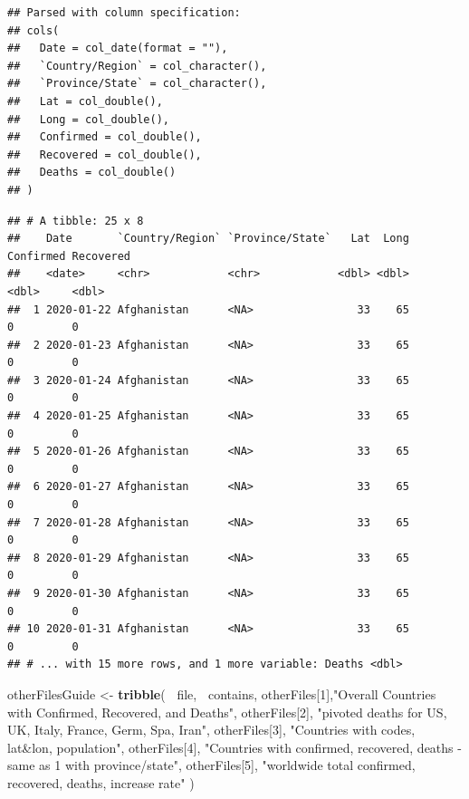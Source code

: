 \documentclass[
]{article}
\newenvironment{Shaded}{\begin{snugshade}}{\end{snugshade}}
\newcommand{\DecValTok}[1]{\textcolor[rgb]{0.00,0.00,0.81}{#1}}
\newcommand{\KeywordTok}[1]{\textcolor[rgb]{0.13,0.29,0.53}{\textbf{#1}}}
\newcommand{\NormalTok}[1]{#1}
\newcommand{\OperatorTok}[1]{\textcolor[rgb]{0.81,0.36,0.00}{\textbf{#1}}}
\newcommand{\StringTok}[1]{\textcolor[rgb]{0.31,0.60,0.02}{#1}}
\begin{document}
\begin{verbatim}
## Parsed with column specification:
## cols(
##   Date = col_date(format = ""),
##   `Country/Region` = col_character(),
##   `Province/State` = col_character(),
##   Lat = col_double(),
##   Long = col_double(),
##   Confirmed = col_double(),
##   Recovered = col_double(),
##   Deaths = col_double()
## )
\end{verbatim}

\begin{verbatim}
## # A tibble: 25 x 8
##    Date       `Country/Region` `Province/State`   Lat  Long Confirmed Recovered
##    <date>     <chr>            <chr>            <dbl> <dbl>     <dbl>     <dbl>
##  1 2020-01-22 Afghanistan      <NA>                33    65         0         0
##  2 2020-01-23 Afghanistan      <NA>                33    65         0         0
##  3 2020-01-24 Afghanistan      <NA>                33    65         0         0
##  4 2020-01-25 Afghanistan      <NA>                33    65         0         0
##  5 2020-01-26 Afghanistan      <NA>                33    65         0         0
##  6 2020-01-27 Afghanistan      <NA>                33    65         0         0
##  7 2020-01-28 Afghanistan      <NA>                33    65         0         0
##  8 2020-01-29 Afghanistan      <NA>                33    65         0         0
##  9 2020-01-30 Afghanistan      <NA>                33    65         0         0
## 10 2020-01-31 Afghanistan      <NA>                33    65         0         0
## # ... with 15 more rows, and 1 more variable: Deaths <dbl>
\end{verbatim}

\begin{Shaded}
\begin{Highlighting}[]
\NormalTok{otherFilesGuide <-}\StringTok{ }\KeywordTok{tribble}\NormalTok{( }\OperatorTok{~}\NormalTok{file, }\OperatorTok{~}\NormalTok{contains,}
\NormalTok{         otherFiles[}\DecValTok{1}\NormalTok{],}\StringTok{"Overall Countries with Confirmed, Recovered, and Deaths"}\NormalTok{,}
\NormalTok{         otherFiles[}\DecValTok{2}\NormalTok{], }\StringTok{"pivoted deaths for US, UK, Italy, France, Germ, Spa, Iran"}\NormalTok{,}
\NormalTok{         otherFiles[}\DecValTok{3}\NormalTok{], }\StringTok{"Countries with codes, lat&lon, population"}\NormalTok{,}
\NormalTok{         otherFiles[}\DecValTok{4}\NormalTok{], }\StringTok{"Countries with confirmed, recovered, deaths - same as 1 with province/state"}\NormalTok{,}
\NormalTok{         otherFiles[}\DecValTok{5}\NormalTok{], }\StringTok{"worldwide total confirmed, recovered, deaths, increase rate"}
\NormalTok{         )}
\end{Highlighting}
\end{Shaded}
\end{document}
